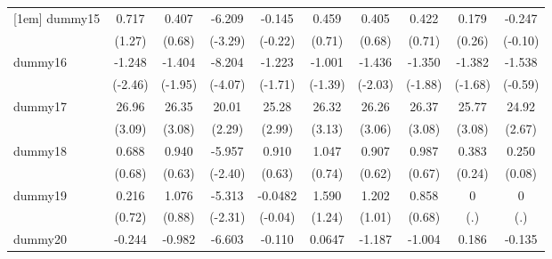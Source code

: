 {\begin{tabular}{l*{9}{c}}
[1em]
dummy15     &       0.717         &       0.407         &      -6.209\sym{**} &      -0.145         &       0.459         &       0.405         &       0.422         &       0.179         &      -0.247         \\
            &      (1.27)         &      (0.68)         &     (-3.29)         &     (-0.22)         &      (0.71)         &      (0.68)         &      (0.71)         &      (0.26)         &     (-0.10)         \\
[1em]
dummy16     &      -1.248\sym{*}  &      -1.404         &      -8.204\sym{***}&      -1.223         &      -1.001         &      -1.436\sym{*}  &      -1.350         &      -1.382         &      -1.538         \\
            &     (-2.46)         &     (-1.95)         &     (-4.07)         &     (-1.71)         &     (-1.39)         &     (-2.03)         &     (-1.88)         &     (-1.68)         &     (-0.59)         \\
[1em]
dummy17     &       26.96\sym{**} &       26.35\sym{**} &       20.01\sym{*}  &       25.28\sym{**} &       26.32\sym{**} &       26.26\sym{**} &       26.37\sym{**} &       25.77\sym{**} &       24.92\sym{**} \\
            &      (3.09)         &      (3.08)         &      (2.29)         &      (2.99)         &      (3.13)         &      (3.06)         &      (3.08)         &      (3.08)         &      (2.67)         \\
[1em]
dummy18     &       0.688         &       0.940         &      -5.957\sym{*}  &       0.910         &       1.047         &       0.907         &       0.987         &       0.383         &       0.250         \\
            &      (0.68)         &      (0.63)         &     (-2.40)         &      (0.63)         &      (0.74)         &      (0.62)         &      (0.67)         &      (0.24)         &      (0.08)         \\
[1em]
dummy19     &       0.216         &       1.076         &      -5.313\sym{*}  &     -0.0482         &       1.590         &       1.202         &       0.858         &           0         &           0         \\
            &      (0.72)         &      (0.88)         &     (-2.31)         &     (-0.04)         &      (1.24)         &      (1.01)         &      (0.68)         &         (.)         &         (.)         \\
[1em]
dummy20     &      -0.244         &      -0.982         &      -6.603\sym{***}&      -0.110         &      0.0647         &      -1.187         &      -1.004         &       0.186         &      -0.135         \\

\end{tabular}}
